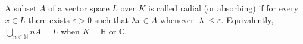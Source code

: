 A subset $A$ of a vector space $L$ over $K$ is called radial (or absorbing) if for every $x \in L$ there exists $\varepsilon > 0$ such that $\lambda x \in A$ whenever $|\lambda| \leq \varepsilon$. Equivalently, $\bigcup_{n \in \mathbb{N}} nA = L$ when $K = \mathbb{R}$ or $\mathbb{C}$.
